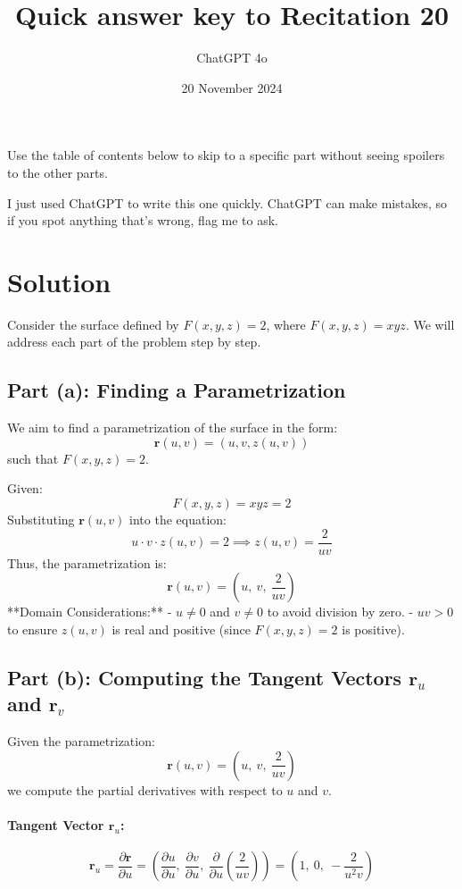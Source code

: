 \documentclass[11pt]{article}
\begin{document}
\title{Quick answer key to Recitation 20}
\author{ChatGPT 4o}
\date{20 November 2024}
\maketitle

Use the table of contents below to skip to a specific part
without seeing spoilers to the other parts.

I just used ChatGPT to write this one quickly.
ChatGPT can make mistakes, so if you spot anything that's wrong, flag me to ask.

\tableofcontents

\section{Solution}
Consider the surface defined by \( F(x,y,z) = 2 \), where \( F(x,y,z) = xyz \). We will address each part of the problem step by step.

\newpage

\subsection{Part (a): Finding a Parametrization}

We aim to find a parametrization of the surface in the form:
\[
\mathbf{r}(u, v) = (u, v, z(u, v))
\]
such that \( F(x,y,z) = 2 \).

Given:
\[
F(x,y,z) = xyz = 2
\]
Substituting \( \mathbf{r}(u, v) \) into the equation:
\[
u \cdot v \cdot z(u, v) = 2 \implies z(u, v) = \frac{2}{uv}
\]
Thus, the parametrization is:
\[
\boxed{ \mathbf{r}(u, v) = \left( u,\ v,\ \frac{2}{uv} \right ) }
\]
**Domain Considerations:**
- \( u \neq 0 \) and \( v \neq 0 \) to avoid division by zero.
- \( uv > 0 \) to ensure \( z(u, v) \) is real and positive (since \( F(x,y,z) = 2 \) is positive).

\newpage

\subsection{Part (b): Computing the Tangent Vectors \( \mathbf{r}_u \) and \( \mathbf{r}_v \)}

Given the parametrization:
\[
\mathbf{r}(u, v) = \left( u,\ v,\ \frac{2}{uv} \right )
\]
we compute the partial derivatives with respect to \( u \) and \( v \).

\paragraph{Tangent Vector \( \mathbf{r}_u \):}
\[
\mathbf{r}_u = \frac{\partial \mathbf{r}}{\partial u} = \left( \frac{\partial u}{\partial u},\ \frac{\partial v}{\partial u},\ \frac{\partial}{\partial u} \left( \frac{2}{uv} \right ) \right ) = \left( 1,\ 0,\ -\frac{2}{u^2 v} \right )
\]
\end{document}
